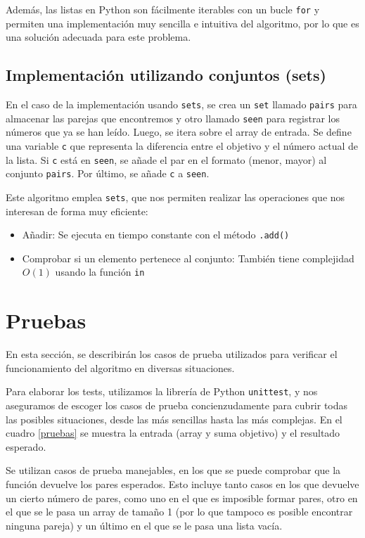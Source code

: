 \documentclass[a4paper, titlepage]{article}
\begin{document}
Además, las listas en Python son fácilmente iterables con un bucle \texttt{for} y permiten una implementación muy sencilla e intuitiva del algoritmo, por lo que es una solución adecuada para este problema.


\subsection{Implementación utilizando conjuntos (sets)}

En el caso de la implementación usando \texttt{sets}, se crea un \texttt{set} llamado \texttt{pairs} para almacenar las parejas que encontremos y otro llamado \texttt{seen} para registrar los números que ya se han leído. Luego, se itera sobre el array de entrada. Se define una variable \texttt{c} que representa la diferencia entre el objetivo y el número actual de la lista. Si \texttt{c} está en \texttt{seen}, se añade el par en el formato (menor, mayor) al conjunto \texttt{pairs}. Por último, se añade \texttt{c} a \texttt{seen}.

Este algoritmo emplea \texttt{sets}, que nos permiten realizar las operaciones que nos interesan de forma muy eficiente:

\begin{itemize}

\item{Añadir: Se ejecuta en tiempo constante con el método \texttt{.add()}}

\item{Comprobar si un elemento pertenece al conjunto: También tiene complejidad $O(1)$ usando la función \texttt{in}}

\end{itemize}




\section{Pruebas}
En esta sección, se describirán los casos de prueba utilizados para verificar el funcionamiento del algoritmo en diversas situaciones.

Para elaborar los tests, utilizamos la librería de Python \texttt{unittest}, y nos aseguramos de escoger los casos de prueba concienzudamente para cubrir todas las posibles situaciones, desde las más sencillas hasta las más complejas. En el cuadro \ref{pruebas} se muestra la entrada (array y suma objetivo) y el resultado esperado.

Se utilizan casos de prueba manejables, en los que se puede comprobar que la función devuelve los pares esperados. Esto incluye tanto casos en los que devuelve un cierto número de pares, como uno en el que es imposible formar pares, otro en el que se le pasa un array de tamaño 1 (por lo que tampoco es posible encontrar ninguna pareja) y un último en el que se le pasa una lista vacía.
\end{document}

